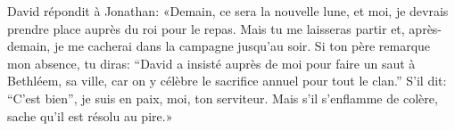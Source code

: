 David répondit à Jonathan:
	«Demain, ce sera la nouvelle lune,
	et moi, je devrais prendre place auprès du roi pour le repas.
Mais tu me laisseras partir
	et, après-demain, je me cacherai dans la campagne jusqu’au soir.
Si ton père remarque mon absence, tu diras:
	“David a insisté auprès de moi pour faire un saut à Bethléem, sa ville,
	car on y célèbre le sacrifice annuel pour tout le clan.”
S’il dit: “C’est bien”,
	je suis en paix, moi, ton serviteur.
Mais s’il s’enflamme de colère, sache qu’il est résolu au pire.»
